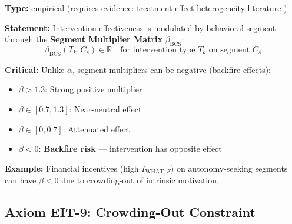 \begin{tcolorbox}[colback=blue!5!white, colframe=blue!75!black,
    title=\textbf{Axiom EIT-8: Segment Multiplier}]

\textbf{Type:} empirical (requires evidence: treatment effect heterogeneity literature \citep{athey2016recursive})

\textbf{Statement:} Intervention effectiveness is modulated by behavioral segment through the \textbf{Segment Multiplier Matrix} $\beta_{\text{BCS}}$:
\begin{equation}
\boxed{\beta_{\text{BCS}}(T_k, C_s) \in \mathbb{R} \quad \text{for intervention type } T_k \text{ on segment } C_s}
\label{eq:ie-segment-multiplier}
\end{equation}

\textbf{Critical:} Unlike $\alpha$, segment multipliers can be negative (backfire effects):
\begin{itemize}[nosep]
    \item $\beta > 1.3$: Strong positive multiplier
    \item $\beta \in [0.7, 1.3]$: Near-neutral effect
    \item $\beta \in [0, 0.7]$: Attenuated effect
    \item $\beta < 0$: \textbf{Backfire risk} --- intervention has opposite effect
\end{itemize}

\textbf{Example:} Financial incentives (high $I_{\text{WHAT},F}$) on autonomy-seeking segments can have $\beta < 0$ due to crowding-out of intrinsic motivation.

\end{tcolorbox}

\subsection{Axiom EIT-9: Crowding-Out Constraint}

